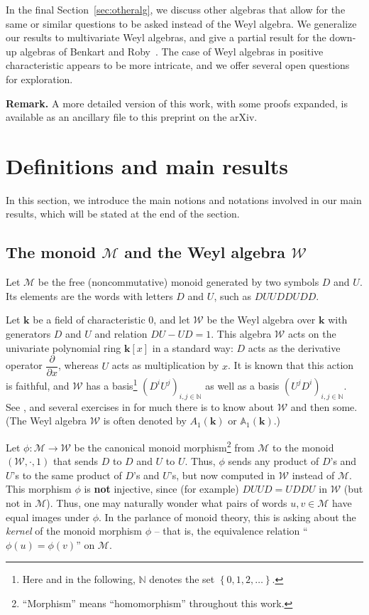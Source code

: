 \documentclass[numbers=enddot,12pt,final,onecolumn,notitlepage]{scrartcl}%
\theoremstyle{definition}
\newcommand{\W}{\mathcal{W}}
\newcommand{\M}{\mathcal{M}}
\newcommand{\kk}{\mathbf{k}}
\newcommand{\NN}{\mathbb{N}}
\newcommand{\set}[1]{\left\{ #1 \right\}}
\newcommand{\tup}[1]{\left( #1 \right)}
\begin{document}
In the final Section~\ref{sec:otheralg}, we discuss other algebras that allow for the same or similar questions to be asked instead of the Weyl algebra.
We generalize our results to multivariate Weyl algebras, and give a partial result for the down-up algebras of Benkart and Roby~\cite{BenRob98}.
The case of Weyl algebras in positive characteristic appears to be more intricate, and we offer several open questions for exploration.

\bigskip

\textbf{Remark.} A more detailed version of this work, with some proofs expanded, is available as an ancillary file to this preprint on the arXiv.

\section{Definitions and main results}\label{sec:defs}

In this section, we introduce the main notions and notations involved in our main results, which will be stated at the end of the section.

\subsection{\label{subsec:defs.action}The monoid $\M$ and the Weyl algebra $\W$}

Let $\M$ be the free (noncommutative) monoid generated by two symbols
$D$ and $U$. Its elements are the words with letters $D$ and $U$, such as
$DUUDDUDD$.

Let $\kk$ be a field of characteristic $0$, and let $\W$ be the Weyl algebra over $\kk$ with generators $D$
and $U$ and relation $DU-UD=1$. This algebra $\W$ acts on the
univariate polynomial ring $\kk\left[  x\right]  $ in a standard way:
$D$ acts as the derivative operator $\dfrac{\partial}{\partial x}$, whereas $U$ acts as multiplication
by $x$. It is known that this action is faithful, and $\W$ has a
basis\footnote{Here and in the following, $\NN$ denotes the set $\set{0,1,2,\ldots}$.}
$\left(  D^{i}U^{j}\right)  _{i,j\in\NN}$ as well as a basis
$\left(  U^{j}D^{i}\right)  _{i,j\in\NN}$.
See \cite{ManSch16}, \cite{vanOys13} and several exercises in \cite{Lorenz18} for much
there is to know about $\W$ and then some.
(The Weyl algebra $\W$ is often denoted by $A_1\tup{\kk}$ or $\mathbb{A}_1\tup{\kk}$.)

Let $\phi : \M \to \W$ be the canonical monoid
morphism\footnote{``Morphism'' means ``homomorphism'' throughout this work.} from $\M$ to the monoid $\left(  \W,\cdot,1\right)  $ that
sends $D$ to $D$ and $U$ to $U$.
Thus, $\phi$ sends any product of $D$'s and $U$'s to the same product of $D$'s and $U$'s, but now computed in $\W$ instead of $\M$.
This morphism $\phi$ is \textbf{not}
injective, since (for example) $DUUD=UDDU$ in $\W$ (but not in
$\M$).
Thus, one may naturally wonder what pairs of words $u, v \in \M$ have equal images under $\phi$.
In the parlance of monoid theory, this is asking about the \emph{kernel} of the monoid morphism $\phi$ -- that is, the equivalence relation ``$\phi\left(u\right) = \phi\left(v\right)$'' on $\M$.
\end{document}
